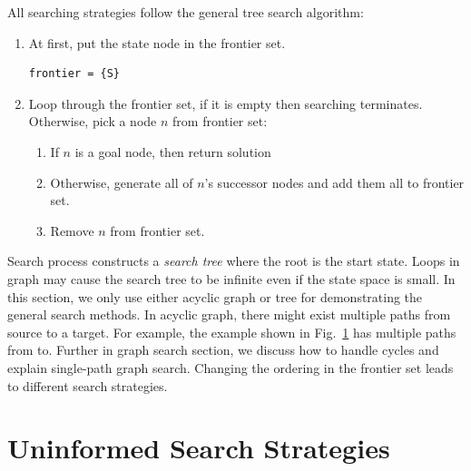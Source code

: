 \documentclass[../main.tex]{subfiles}
\begin{document}
All searching strategies follow the general tree search algorithm:
\begin{enumerate}
    \item At first, put the state node in the frontier set. 
\begin{lstlisting}
frontier = {S}
\end{lstlisting}
\item Loop through the frontier set, if it is empty then searching terminates. Otherwise, pick a node $n$ from frontier set:
\begin{enumerate}
    \item If $n$ is a goal node, then return solution
    \item Otherwise, generate all of $n$'s successor nodes and add them all to frontier set.
    \item Remove $n$ from frontier set.
\end{enumerate}
\end{enumerate}
Search process constructs a \textit{search tree} where the root is the start state. Loops in graph may cause the search tree to be infinite even if the state space is small. In this section, we only use either acyclic graph or tree for demonstrating the general search methods. In acyclic graph, there might exist multiple paths from source to a target. For example, the example shown in Fig.~\ref{} has multiple paths from to. Further in graph search section, we discuss how to handle cycles and explain single-path graph search.  Changing the ordering in the frontier set leads to different search strategies.


\section{Uninformed Search Strategies}
\end{document}
